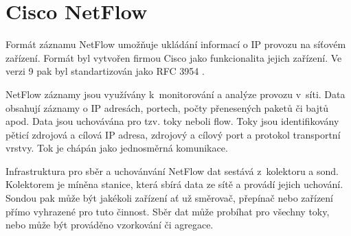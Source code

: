 \section{Cisco NetFlow}
\label{netflow}

Formát záznamu NetFlow umožňuje ukládání informací o IP provozu na síťovém zařízení. Formát byl
 vytvořen firmou Cisco jako funkcionalita jejich zařízení. Ve verzi 9 pak byl standartizován
 jako RFC 3954 \cite{rfc3954}.

NetFlow záznamy jsou využívány k~monitorování a analýze provozu v~síti. Data obsahují záznamy
 o IP adresách, portech, počty přenesených paketů či bajtů apod. Data jsou uchovávána pro
 tzv. toky neboli flow. Toky jsou identifikovány pěticí zdrojová a cílová IP adresa,
 zdrojový a cílový port a protokol transportní vrstvy. Tok je chápán jako jednosměrná komunikace.

Infrastruktura pro sběr a uchovánvání NetFlow dat sestává z~kolektoru a sond. Kolektorem je míněna
 stanice, která sbírá data ze sítě a provádí jejich uchování. Sondou pak může být jakékoli zařízení
 ať už směrovač, přepínač nebo zařízení přímo vyhrazené pro tuto činnost. Sběr dat může probíhat
 pro všechny toky, nebo může být prováděno vzorkování či agregace. 

